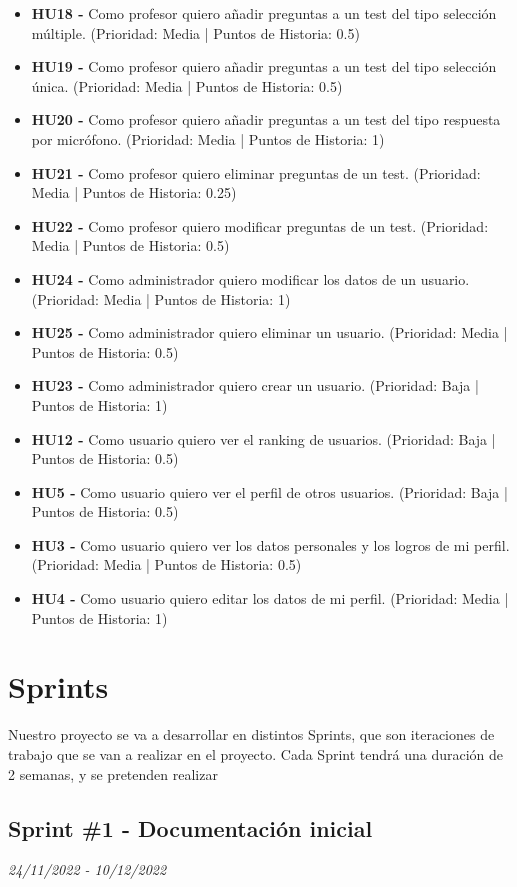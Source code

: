 \begin{itemize}
    \item \textbf{HU18 - } Como profesor quiero añadir preguntas a un test del tipo selección múltiple. (Prioridad: Media | Puntos de Historia: 0.5)
    \item \textbf{HU19 - } Como profesor quiero añadir preguntas a un test del tipo selección única. (Prioridad: Media | Puntos de Historia: 0.5)
    \item \textbf{HU20 - } Como profesor quiero añadir preguntas a un test del tipo respuesta por micrófono. (Prioridad: Media | Puntos de Historia: 1)
    \item \textbf{HU21 - } Como profesor quiero eliminar preguntas de un test. (Prioridad: Media | Puntos de Historia: 0.25)
    \item \textbf{HU22 - } Como profesor quiero modificar preguntas de un test. (Prioridad: Media | Puntos de Historia: 0.5)
    \item \textbf{HU24 - } Como administrador quiero modificar los datos de un usuario. (Prioridad: Media | Puntos de Historia: 1)
    \item \textbf{HU25 - } Como administrador quiero eliminar un usuario. (Prioridad: Media | Puntos de Historia: 0.5)
    \item \textbf{HU23 - } Como administrador quiero crear un usuario. (Prioridad: Baja | Puntos de Historia: 1)
    \item \textbf{HU12 - } Como usuario quiero ver el ranking de usuarios. (Prioridad: Baja | Puntos de Historia: 0.5)
    \item \textbf{HU5 - } Como usuario quiero ver el perfil de otros usuarios.  (Prioridad: Baja | Puntos de Historia: 0.5)
    \item \textbf{HU3 - } Como usuario quiero ver los datos personales y los logros de mi perfil. (Prioridad: Media | Puntos de Historia: 0.5)
    \item \textbf{HU4 - } Como usuario quiero editar los datos de mi perfil. (Prioridad: Media | Puntos de Historia: 1)


\end{itemize}

\section{Sprints}
Nuestro proyecto se va a desarrollar en distintos Sprints, que son iteraciones de trabajo que se van a realizar en el proyecto.
Cada Sprint tendrá una duración de 2 semanas, y se pretenden realizar
\subsection{Sprint \#1 - Documentación inicial}
\textit{24/11/2022   -   10/12/2022}

